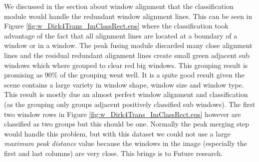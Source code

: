 






We discussed in the section about window alignment that the classification
module would handle the redundant window alignment lines. 
This can be seen in Figure \ref{fig:w_Dirk4Trans_ImClassRect.eps} where the 
classification took advantage of the fact that all alignment lines are located at a boundary of a window or in a window. 
The peak fusing module discarded many close alignment lines and the residual redundant alignment lines create
small green adjacent sub windows which where grouped to clear red big windows.
This grouping result is promising as 90\% of the grouping went well. It is a quite good result given the scene contains a large variety in window
shape, window size and window type.  This result is mostly due an almost perfect window alignment and classification 
(as the grouping only groups adjacent positively classified sub windows).
The first two window rows in Figure \ref{fig:w_Dirk4Trans_ImClassRect.eps}
however are classified as two groups but this should be one.
Normally the peak merging step would handle this problem, but with this dataset
we could not use a large \emph{maximum peak distance} value because the windows
in the image (especially the first and last columns) are very close.  This
brings is to Future research.
\clearpage



